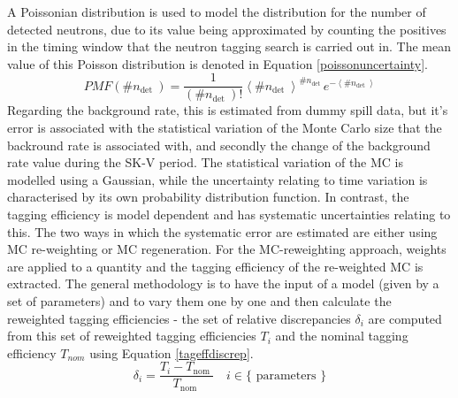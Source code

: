 A Poissonian distribution is used to model the distribution for the number of detected neutrons, due to its value being approximated by counting the positives in the timing window that the neutron tagging search is carried out in. The mean value of this Poisson distribution is denoted in Equation \eqref{poissonuncertainty}.
\newline
\begin{equation}
    P M F\left(\# n_{\text {det }}\right)=\frac{1}{\left(\# n_{\text {det }}\right) !}\left\langle \# n_{\text {det }}\right\rangle^{\# n_{\text {det }}} e^{-\left\langle \# n_{\text {det }}\right\rangle}
\label{poissonuncertainty}
\end{equation}
\newline
Regarding the background rate, this is estimated from dummy spill data, but it's error is associated with the statistical variation of the Monte Carlo size that the backround rate is associated with, and secondly the change of the background rate value during the SK-V period. The statistical variation of the MC is modelled using a Gaussian, while the uncertainty relating to time variation is characterised by its own probability distribution function. In contrast, the tagging efficiency is model dependent and has systematic uncertainties relating to this. The two ways in which the systematic error are estimated are either using MC re-weighting or MC regeneration.
\newline
For the MC-reweighting approach, weights are applied to a quantity and the tagging efficiency of the re-weighted MC is extracted. The general methodology is to have the input of a model (given by a set of parameters) and to vary them one by one and then calculate the reweighted tagging efficiencies - the set of relative discrepancies $\delta_{i}$ are computed from this set of reweighted tagging efficiencies $T_{i}$ and the nominal tagging efficiency $T_{nom}$ using Equation \eqref{tageffdiscrep}.
\newline
\begin{equation}
    \delta_{i}=\frac{T_{i}-T_{\text {nom }}}{T_{\text {nom }}} \quad i \in\{\text { parameters }\}
\label{tageffdiscrep}
\end{equation}
\newline

